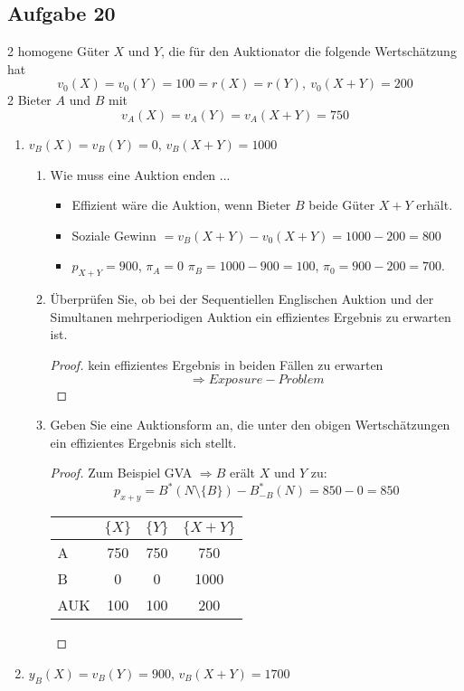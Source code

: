 \documentclass[12pt]{extreport} %
\theoremstyle{named}
\theoremstyle{nnamed}
\theoremstyle{itshape}
\theoremstyle{normal}
\begin{document}
\subsection*{Aufgabe 20}

2 homogene Güter $X$ und $Y$, die für den Auktionator die folgende Wertschätzung hat
$$ v_0(X) = v_0(Y) = 100 = r(X) = r(Y), ~ v_0(X+Y) = 200 $$
2 Bieter $A$ und $B$ mit
$$ v_A(X) = v_A(Y) = v_A(X+Y) = 750 $$
\begin{enumerate}
	\item $v_B(X) = v_B(Y) = 0$, $v_B(X+Y) = 1000$ 
		\begin{enumerate}[label=\arabic*.]
			\item Wie muss eine Auktion enden ... ~\\
				\begin{itemize}
					\item Effizient wäre die Auktion, wenn Bieter $B$ beide Güter $X+Y$ erhält. 
					\item Soziale Gewinn $= v_B(X+Y) - v_0(X+Y) = 1000 - 200 = 800$
					\item $p_{X+Y} = 900$, $\pi_A = 0$ $\pi_B = 1000 - 900 = 100$, $\pi_0 = 900 - 200 = 700$.
				\end{itemize}
			\item Überprüfen Sie, ob bei der Sequentiellen Englischen Auktion und der Simultanen mehrperiodigen Auktion ein effizientes Ergebnis zu erwarten ist.
				\begin{proof}
					kein effizientes Ergebnis in beiden Fällen zu erwarten
					$$ \Rightarrow Exposure-Problem $$
				\end{proof}
			\item Geben Sie eine Auktionsform an, die unter den obigen Wertschätzungen ein effizientes Ergebnis sich stellt.
				\begin{proof}
					Zum Beispiel GVA $\Rightarrow B $ erält $X$ und $Y$ zu:
					$$ p_{x+y} = B^{*}(N \setminus \{ B \} ) - B_{-B}^{*}(N) = 850 - 0 = 850 $$
					\begin{tabular}{l|ccc}
  						& $\{ X \}$ & $\{ Y \}$ & $\{ X + Y \}$ \\
  						\hline
  						A & 750 & 750 & 750 \\
  						B & 0 & 0 & 1000 \\
  						AUK & 100 & 100 & 200
					\end{tabular}
				\end{proof}
		\end{enumerate}	
	\item $y_B(X) = v_B(Y) = 900$, $v_B(X+Y) = 1700$

\end{enumerate}
\end{document}
